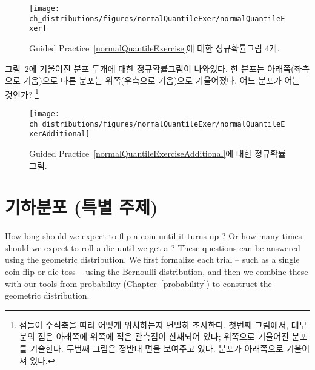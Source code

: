 \begin{figure}
\centering
\texttt{[image: ch\_distributions/figures/normalQuantileExer/normalQuantileExer]}
\caption{Guided Practice~\ref{normalQuantileExercise}에 대한 정규확률그림 4개.}
\label{normalQuantileExer}
\end{figure}


\begin{exercise} \label{normalQuantileExerciseAdditional}
그림~\ref{normalQuantileExerAdditional}에 기울어진 분포 두개에 대한 정규확률그림이 나와있다. 한 분포는 아래쪽(좌측으로 기움)으로 다른 분포는 위쪽(우측으로 기움)으로 기울어졌다. 어느 분포가 어는 것인가?
\footnote{
점들이 수직축을 따라 어떻게 위치하는지 면밀히 조사한다. 첫번째 그림에서, 대부분의 점은 아래쪽에 위쪽에 적은 관측점이 산재되어 있다; 위쪽으로 기울어진 분포를 기술한다. 두번째 그림은 정반대 면을 보여주고 있다. 분포가 아래쪽으로 기울어져 있다.}
\end{exercise}

\begin{figure}
\centering
\texttt{[image: ch\_distributions/figures/normalQuantileExer/normalQuantileExerAdditional]}
\caption{Guided Practice~\ref{normalQuantileExerciseAdditional}에 대한 정규확률그림.}
\label{normalQuantileExerAdditional}
\end{figure}




\section{기하분포 (특별 주제)}
\label{geomDist}

How long should we expect to flip a coin until it turns up ? Or how many times should we expect to roll a die until we get a ? These questions can be answered using the geometric distribution. We first formalize each trial -- such as a single coin flip or die toss -- using the Bernoulli distribution, and then we combine these with our tools from probability (Chapter~\ref{probability}) to construct the geometric distribution.

